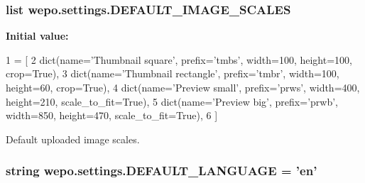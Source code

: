 \hypertarget{namespacewepo_1_1settings_aad7d150719ceae447cdd1e7fbfd41731}{
\subsubsection[{D\-E\-F\-A\-U\-L\-T\-\_\-\-I\-M\-A\-G\-E\-\_\-\-S\-C\-A\-L\-E\-S}]{\setlength{\rightskip}{0pt plus 5cm}list wepo.\-settings.\-D\-E\-F\-A\-U\-L\-T\-\_\-\-I\-M\-A\-G\-E\-\_\-\-S\-C\-A\-L\-E\-S}}\label{namespacewepo_1_1settings_aad7d150719ceae447cdd1e7fbfd41731}
{\bfseries Initial value\-:}
\begin{DoxyCode}
1 = [
2    dict(name=\textcolor{stringliteral}{'Thumbnail square'}, prefix=\textcolor{stringliteral}{'tmbs'}, width=100, height=100, crop=\textcolor{keyword}{True}),
3    dict(name=\textcolor{stringliteral}{'Thumbnail rectangle'}, prefix=\textcolor{stringliteral}{'tmbr'}, width=100, height=60, crop=\textcolor{keyword}{True}),
4    dict(name=\textcolor{stringliteral}{'Preview small'}, prefix=\textcolor{stringliteral}{'prws'}, width=400, height=210, scale\_to\_fit=\textcolor{keyword}{True}),
5    dict(name=\textcolor{stringliteral}{'Preview big'}, prefix=\textcolor{stringliteral}{'prwb'}, width=850, height=470, scale\_to\_fit=\textcolor{keyword}{True}),
6 ]
\end{DoxyCode}


Default uploaded image scales. 

\hypertarget{namespacewepo_1_1settings_a536223da98afe60beb0a6ea3194889ce}{
\subsubsection[{D\-E\-F\-A\-U\-L\-T\-\_\-\-L\-A\-N\-G\-U\-A\-G\-E}]{\setlength{\rightskip}{0pt plus 5cm}string wepo.\-settings.\-D\-E\-F\-A\-U\-L\-T\-\_\-\-L\-A\-N\-G\-U\-A\-G\-E = 'en'}}\label{namespacewepo_1_1settings_a536223da98afe60beb0a6ea3194889ce}



